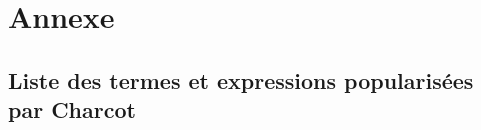 \part*{Annexe}

\chapter*{Liste des termes et expressions popularisées par Charcot}
\label{termes_expressions}


\makeatletter
\renewcommand{\thesection}{\@arabic\c@section}
\makeatother

\setcounter{section}{0}


%

